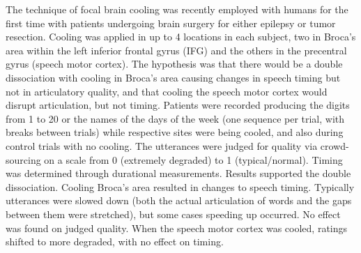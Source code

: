 \documentclass[output=paper,
modfonts
]{LSP/langsci}
\begin{document}
The technique of focal brain cooling was recently employed with humans for the first time \citep{Picardo2016} with patients undergoing brain surgery for either epilepsy or tumor resection. Cooling was applied in up to 4 locations in each subject, two in Broca's area within the left inferior frontal gyrus (IFG) and the others in the precentral gyrus (speech motor cortex). The hypothesis was that there would be a double dissociation with cooling in Broca's area causing changes in speech timing but not in articulatory quality, and that cooling the speech motor cortex would disrupt articulation, but not timing. Patients were recorded producing the digits from 1 to 20 or the names of the days of the week (one sequence per trial, with breaks between trials) while respective sites were being cooled, and also during control trials with no cooling. The utterances were judged for quality via crowd-sourcing on a scale from 0 (extremely degraded) to 1 (typical/normal). Timing was determined through durational measurements. Results supported the double dissociation. Cooling Broca's area resulted in changes to speech timing. Typically utterances  were slowed down (both the actual articulation of words and the gaps between them were stretched), but some cases speeding up occurred. No effect was found on judged quality. When the speech motor cortex was cooled, ratings shifted to more degraded, with no effect on timing.
\end{document}

